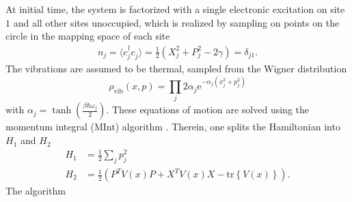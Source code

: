 \documentclass{article}
\newcommand{\exP}[1]{\mathrm{e}^{#1}}
\newcommand{\pdagger}{{\phantom{\dagger}}}
\newcommand{\tr}[1]{\mathrm{tr}\left\{#1\right\}}
\begin{document}
At initial time, the system is factorized with a single electronic excitation on site $1$ and all other sites unoccupied, which is realized by sampling on points on the circle in the mapping space of each site
\begin{align*}
	n_j = \langle c_j^\dagger c_j^\pdagger\rangle = \frac{1}{2}(X_j^2+P_j^2 -2\gamma) =\delta_{j1}.
\end{align*}
The vibrations are assumed to be thermal, sampled from the Wigner distribution 
\begin{equation}
	\rho_\mathrm{vib}(x,p) = \prod_j 2\alpha_j \exP{-\alpha_j (x_j^2+p_j^2)}
\end{equation} 
with $\alpha_j = \tanh(\frac{\beta \hbar\omega_j}{2})$. 
These equations of motion are solved using the momentum integral (MInt) algorithm \cite{cook2023algorithm}. Therein, one splits the Hamiltonian into $H_1$ and $H_2$
\begin{align}
	H_1 &= \frac{1}{2}\sum_j p_j^2\\
	H_2 &= \frac{1}{2}(P^T V(x)P + X^T V(x) X - \tr{V(x)}).
\end{align}
The algorithm 
\clearpage
\end{document}
